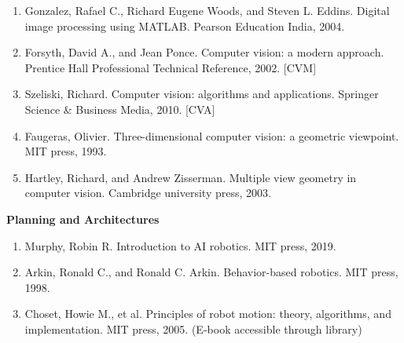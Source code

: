 \documentclass[a4paper]{article}
\begin{document}
\begin{itemize}
\begin{enumerate}[label=(\alph*)]
		\item Gonzalez, Rafael C., Richard Eugene Woods, and Steven L. Eddins. Digital image processing using MATLAB. Pearson Education India, 2004.
		\item Forsyth, David A., and Jean Ponce. Computer vision: a modern approach. Prentice Hall Professional Technical Reference, 2002. [CVM]
 		\item Szeliski, Richard. Computer vision: algorithms and applications. Springer Science \& Business Media, 2010. [CVA]
		\item Faugeras, Olivier. Three-dimensional computer vision: a geometric viewpoint. MIT press, 1993.
		\item Hartley, Richard, and Andrew Zisserman. Multiple view geometry in computer vision. Cambridge university press, 2003.
	\end{enumerate}
	\textbf{Planning and Architectures}
	\begin{enumerate}[label=(\alph*)]
		\item Murphy, Robin R. Introduction to AI robotics. MIT press, 2019.
		\item Arkin, Ronald C., and Ronald C. Arkin. Behavior-based robotics. MIT press, 1998.
		\item Choset, Howie M., et al. Principles of robot motion: theory, algorithms, and implementation. MIT press, 2005. (E-book accessible through library)
	\end{enumerate}
\end{itemize}
\end{document}
